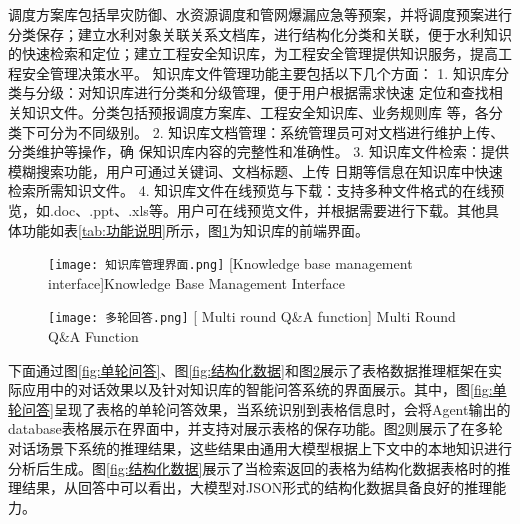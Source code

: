 调度方案库包括旱灾防御、水资源调度和管网爆漏应急等预案，并将调度预案进行分类保存；建立水利对象关联关系文档库，进行结构化分类和关联，便于水利知识的快速检索和定位；建立工程安全知识库，为工程安全管理提供知识服务，提高工程安全管理决策水平。
知识库文件管理功能主要包括以下几个方面：
1. 知识库分类与分级：对知识库进行分类和分级管理，便于用户根据需求快速
定位和查找相关知识文件。分类包括预报调度方案库、工程安全知识库、业务规则库
等，各分类下可分为不同级别。
2. 知识库文档管理：系统管理员可对文档进行维护上传、分类维护等操作，确
保知识库内容的完整性和准确性。
3. 知识库文件检索：提供模糊搜索功能，用户可通过关键词、文档标题、上传
日期等信息在知识库中快速检索所需知识文件。
4. 知识库文件在线预览与下载：支持多种文件格式的在线预览，如.doc、.ppt、.xls等。用户可在线预览文件，并根据需要进行下载。其他具体功能如表\ref{tab:功能说明}所示，图\ref{fig:知识库管理}为知识库的前端界面。
\begin{figure}[htbp]
    \centering
    \texttt{[image: 知识库管理界面.png]}
    [Knowledge base management interface]{Knowledge Base Management Interface}
    \label{fig:知识库管理}
\end{figure}
\begin{figure}[!htbp]
    \centering
    \texttt{[image: 多轮回答.png]}
    [ Multi round Q\&A function]{ Multi Round Q\&A Function}
    \label{fig:多轮对话展示}
\end{figure}

下面通过图\ref{fig:单轮问答}、图\ref{fig:结构化数据}和图\ref{fig:多轮对话展示}展示了表格数据推理框架在实际应用中的对话效果以及针对知识库的智能问答系统的界面展示。其中，图\ref{fig:单轮问答}呈现了表格的单轮问答效果，当系统识别到表格信息时，会将Agent输出的database表格展示在界面中，并支持对展示表格的保存功能。图\ref{fig:多轮对话展示}则展示了在多轮对话场景下系统的推理结果，这些结果由通用大模型根据上下文中的本地知识进行分析后生成。图\ref{fig:结构化数据}展示了当检索返回的表格为结构化数据表格时的推理结果，从回答中可以看出，大模型对JSON形式的结构化数据具备良好的推理能力。

